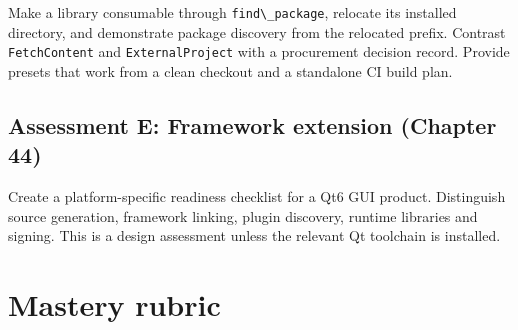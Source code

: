 \documentclass[11pt,letterpaper,oneside]{report}
\providecommand{\passthrough}[1]{#1}
\begin{document}
Make a library consumable through
\passthrough{\lstinline!find\_package!}, relocate its installed
directory, and demonstrate package discovery from the relocated prefix.
Contrast \passthrough{\lstinline!FetchContent!} and
\passthrough{\lstinline!ExternalProject!} with a procurement decision
record. Provide presets that work from a clean checkout and a standalone
CI build plan.

\section{Assessment E: Framework extension (Chapter
44)}\label{assessment-e-framework-extension-chapter-44}

Create a platform-specific readiness checklist for a Qt6 GUI product.
Distinguish source generation, framework linking, plugin discovery,
runtime libraries and signing. This is a design assessment unless the
relevant Qt toolchain is installed.

\chapter{Mastery rubric}\label{mastery-rubric}
\end{document}
